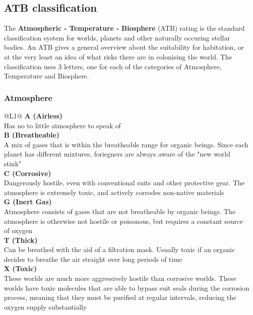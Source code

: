 \subsection{ATB classification}
\label{sec:sector-atb}

The \textbf{Atmospheric - Temperature - Biosphere} (ATB) rating is the standard classification system for worlds, planets and other naturally occuring stellar bodies. An ATB gives a general overview about the suitability for habitation, or at the very least an idea of what risks there are in colonising the world. The classification uses 3 letters, one for each of the categories of Atmosphere, Temperature and Biosphere.

\subsubsection{Atmosphere}

\begin{redtable}{\linewidth}{@{}L{1}@{}}
  \textbf{A (Airless)}\\
  Has no to little atmosphere to speak of\\
  \textbf{B (Breatheable)}\\
  A mix of gases that is within the breatheable range for organic beings. Since each planet has different mixtures, foriegners are always aware of the "new world stink"\\
  \textbf{C (Corrosive)}\\
  Dangerously hostile, even with conventional suits and other protective gear. The atmosphere is extremely toxic, and actively corrodes non-native materials\\
  \textbf{G (Inert Gas)}\\
  Atmosphere consists of gases that are not breatheable by organic beings. The atmosphere is otherwise not hostile or poisonous, but requires a constant source of oxygen\\
  \textbf{T (Thick)}\\
  Can be breathed with the aid of a filtration mask. Usually toxic if an organic decides to breathe the air straight over long periods of time\\
  \textbf{X (Toxic)}\\
  These worlds are much more aggressively hostile than corrosive worlds. These worlds have toxic molecules that are able to bypass suit seals during the corrosion process, meaning that they must be purified at regular intervals, reducing the oxygen supply substantially\\
\end{redtable}

